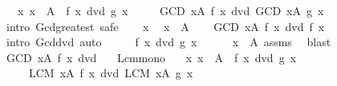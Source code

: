 \begin{isabellebody}
\ \ \ {\isachardoublequoteopen}{\isasymAnd}x{\isachardot}{\kern0pt}\ x\ {\isasymin}\ A\ {\isasymLongrightarrow}\ f\ x\ dvd\ g\ x{\isachardoublequoteclose}\isanewline
\ \ \ \ \ {\isachardoublequoteopen}{\isacharparenleft}{\kern0pt}GCD\ x{\isasymin}A{\isachardot}{\kern0pt}\ f\ x{\isacharparenright}{\kern0pt}\ dvd\ {\isacharparenleft}{\kern0pt}GCD\ x{\isasymin}A{\isachardot}{\kern0pt}\ g\ x{\isacharparenright}{\kern0pt}{\isachardoublequoteclose}\isanewline
%
\isadelimproof
%
\endisadelimproof
%
\isatagproof
{}\isamarkupfalse%
\ {\isacharparenleft}{\kern0pt}intro\ Gcd{\isacharunderscore}{\kern0pt}greatest{\isacharcomma}{\kern0pt}\ safe{\isacharparenright}{\kern0pt}\isanewline
\ \ \isamarkupfalse%
\ x\ \isamarkupfalse%
\ {\isachardoublequoteopen}x\ {\isasymin}\ A{\isachardoublequoteclose}\isanewline
\ \ \isamarkupfalse%
\ {\isachardoublequoteopen}{\isacharparenleft}{\kern0pt}GCD\ x{\isasymin}A{\isachardot}{\kern0pt}\ f\ x{\isacharparenright}{\kern0pt}\ dvd\ f\ x{\isachardoublequoteclose}\isanewline
\ \ \ \ \isamarkupfalse%
\ {\isacharparenleft}{\kern0pt}intro\ Gcd{\isacharunderscore}{\kern0pt}dvd{\isacharparenright}{\kern0pt}\ auto\isanewline
\ \ \isamarkupfalse%
\ \isamarkupfalse%
\ {\isachardoublequoteopen}f\ x\ dvd\ g\ x{\isachardoublequoteclose}\isanewline
\ \ \ \ \isamarkupfalse%
\ {\isacartoucheopen}x\ {\isasymin}\ A{\isacartoucheclose}\ assms\ \isamarkupfalse%
\ blast\isanewline
\ \ \isamarkupfalse%
\ \isamarkupfalse%
\ {\isachardoublequoteopen}{\isacharparenleft}{\kern0pt}GCD\ x{\isasymin}A{\isachardot}{\kern0pt}\ f\ x{\isacharparenright}{\kern0pt}\ dvd\ {\isasymdots}{\isachardoublequoteclose}\ \isacommand{{\isachardot}{\kern0pt}}\isamarkupfalse%
\isanewline
{}\isamarkupfalse%
%
\endisatagproof
{\isafoldproof}%
%
\isadelimproof
\isanewline
%
\endisadelimproof
\isanewline
{}\isamarkupfalse%
\ Lcm{\isacharunderscore}{\kern0pt}mono{\isacharcolon}{\kern0pt}\isanewline
\ \ \ {\isachardoublequoteopen}{\isasymAnd}x{\isachardot}{\kern0pt}\ x\ {\isasymin}\ A\ {\isasymLongrightarrow}\ f\ x\ dvd\ g\ x{\isachardoublequoteclose}\isanewline
\ \ \ \ \ {\isachardoublequoteopen}{\isacharparenleft}{\kern0pt}LCM\ x{\isasymin}A{\isachardot}{\kern0pt}\ f\ x{\isacharparenright}{\kern0pt}\ dvd\ {\isacharparenleft}{\kern0pt}LCM\ x{\isasymin}A{\isachardot}{\kern0pt}\ g\ x{\isacharparenright}{\kern0pt}{\isachardoublequoteclose}\isanewline

\end{isabellebody}
